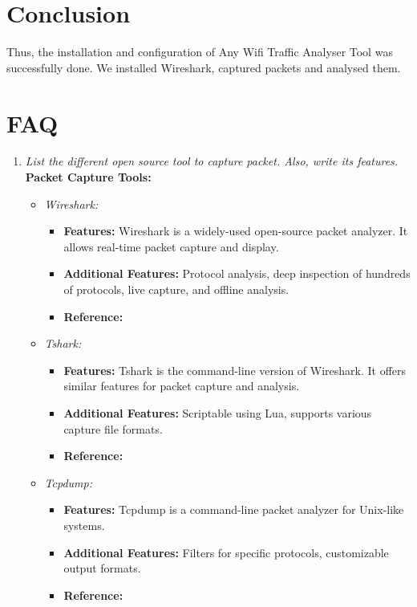 \documentclass[11pt]{article}
\begin{document}
\section{Conclusion}
Thus, the installation and configuration of Any Wifi Traffic Analyser Tool was
successfully done. We installed Wireshark, captured packets and analysed them.

\section{FAQ}

\begin{enumerate}
	\item \textit{List the different open source tool to capture packet. Also, write its
		      features.}\\

	      \textbf{Packet Capture Tools:}
	      \begin{itemize}
		      \item \textit{Wireshark:}
		            \begin{itemize}
			            \item \textbf{Features:} Wireshark is a widely-used open-source packet analyzer. It allows real-time packet capture and display.
			            \item \textbf{Additional Features:} Protocol analysis, deep inspection of hundreds of protocols, live capture, and offline analysis.
			            \item \textbf{Reference:} \cite{wireshark}
		            \end{itemize}

		      \item \textit{Tshark:}
		            \begin{itemize}
			            \item \textbf{Features:} Tshark is the command-line version of Wireshark. It offers similar features for packet capture and analysis.
			            \item \textbf{Additional Features:} Scriptable using Lua, supports various capture file formats.
			            \item \textbf{Reference:} \cite{tshark}
		            \end{itemize}

		      \item \textit{Tcpdump:}
		            \begin{itemize}
			            \item \textbf{Features:} Tcpdump is a command-line packet analyzer for Unix-like systems.
			            \item \textbf{Additional Features:} Filters for specific protocols, customizable output formats.
			            \item \textbf{Reference:} \cite{tcpdump}
		            \end{itemize}
	      \end{itemize}


\end{enumerate}
\end{document}
